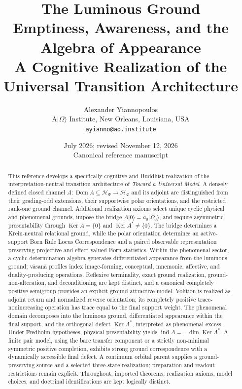 \documentclass[11pt,reqno]{scrartcl}
\title{\textbf{The Luminous Ground}\\[3pt]
\Large Emptiness, Awareness, and the Algebra of Appearance\\[7pt]
\large A Cognitive Realization of the Universal Transition Architecture}
\author{Alexander Yiannopoulos\\[2pt]
\small A$\lvert\Omega\rangle$ Institute, New Orleans, Louisiana, USA\\
\small\texttt{ayianno@ao.institute}}
\date{July 2026; revised November 12, 2026\\[5pt]\small Canonical reference manuscript}
\newcommand{\scrHP}{\mathscr H_{\Psi}}
\newcommand{\scrHF}{\mathscr H_{\Phi}}
\newcommand{\ket}[1]{\lvert #1\rangle}
\DeclareMathOperator{\Dom}{Dom}
\DeclareMathOperator{\Ker}{Ker}
\DeclareMathOperator{\ind}{ind}
\theoremstyle{plain}
\theoremstyle{definition}
\theoremstyle{remark}
\begin{document}
\maketitle
\vspace{-1.5\baselineskip}

\begin{abstract}
\noindent
This reference develops a specifically cognitive and Buddhist realization of
the interpretation-neutral transition architecture of \emph{Toward a
Universal Model}.  A densely defined closed channel
$A:\Dom A\subseteq\scrHP\to\scrHF$ and its adjoint are distinguished from
their grading-odd extensions, their supportwise polar orientations, and the
restricted rank-one ground channel.  Additional realization axioms select
unique cyclic physical and phenomenal grounds, impose the bridge
$A\ket0=a_0\ket{\Omega_0}$, and require asymmetric presentability through
$\Ker A=\{0\}$ and $\Ker A^*\neq\{0\}$.  The bridge determines a
Krein-neutral relational ground, while the polar orientation determines an
active-support Born Rule Locus Correspondence and a paired observable
representation preserving projective and effect-valued Born statistics.
Within the phenomenal sector, a cyclic determination algebra generates
differentiated appearance from the luminous ground; v\=asan\=a profiles index
image-forming, conceptual, mnemonic, affective, and duality-producing
operations.  Reflexive terminality, exact ground realization,
ground-non-alteration, and deconditioning are kept distinct, and a canonical
completely positive semigroup provides an explicit ground-attractive model.
Volition is realized as adjoint return and normalized reverse orientation; its
completely positive trace-nonincreasing operation has trace equal to the final
support weight.  The phenomenal domain decomposes into the luminous ground,
differentiated appearance within the final support, and the orthogonal defect
$\Ker A^*$, interpreted as phenomenal excess.  Under Fredholm hypotheses,
physical presentability yields $\ind A=-\dim\Ker A^*$.
A finite pair model, using the bare transfer component or a strictly
non-minimal symmetric positive completion, exhibits strong ground
correspondence with a dynamically accessible final defect.  A continuum
orbital parent supplies a ground-preserving source and a selected
three-state realization; preparation and readout restrictions remain
explicit.  Throughout, imported
theorems, realization axioms, model choices, and doctrinal identifications are
kept logically distinct.
\end{abstract}
\end{document}
